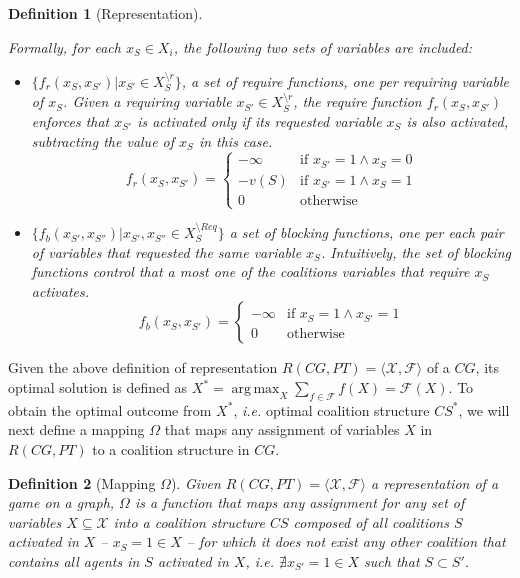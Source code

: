 \documentclass[11pt, twoside, titlepage, a4paper, openright]{report}
\newtheorem{Def}{Definition}
\begin{document}
\begin{Def}[Representation]
\begin{itemize}
\begin{itemize}
Formally, for each $x_S \in X_i$, the following two sets of variables are included:
\begin{itemize}
\renewcommand{\labelitemiii}{$\cdot$}
\item $\{f_r(x_S,x_{S'})|x_{S'}\in X^{\setminus r}_S\}$, a set of \textit{require functions}, one per requiring variable of $x_S$. Given a requiring variable $x_{S'}\in X^{\setminus r}_S$, the require function $f_r(x_S,x_{S'})$ enforces that $x_{S'}$ is activated only if its requested variable $x_S$ is also activated, subtracting the value of $x_S$ in this case.
\begin{equation}\label{eq:reqfun}
f_r(x_S,x_{S'})=\begin{cases}-\infty & \mbox{if } x_{S'}=1 \wedge x_{S}=0\\-v(S) & \mbox{if } x_{S'}=1 \wedge x_{S}=1\\0 & \mbox{otherwise}\end{cases}
\end{equation}
\item $\{f_b(x_{S'},x_{S''})|x_{S'},x_{S''}\in X^{\setminus Req}_S\}$ a set of \textit{blocking functions}, one per each pair of variables that requested the same variable $x_S$. Intuitively, the set of blocking functions control that a most one of the coalitions variables that require $x_S$ activates.
\begin{equation}\label{eq:blockfun}
f_b(x_S,x_{S'})=\begin{cases}-\infty & \mbox{if } x_{S}=1 \wedge x_{S'}=1\\0 & \mbox{otherwise}\end{cases}
\end{equation}
\end{itemize}
\end{itemize}
\end{itemize}
\end{Def}

\noindent Given the above definition of representation $R(CG,PT)=\langle\mathcal{X},\mathcal{F}\rangle$ of a $CG$, its optimal solution is defined as $X^*=\operatorname{arg\,max}_{X}\sum_{f\in\mathcal{F}}f(X)=\mathcal{F}(X)$. To obtain the optimal outcome from $X^*$, \textit{i.e.} optimal coalition structure $CS^*$, we will next define a mapping $\Omega$ that maps any assignment of variables $X$ in $R(CG,PT)$ to
a coalition structure in $CG$.

\begin{Def}[Mapping $\Omega$]
Given $R(CG, PT) = \langle\mathcal{X},\mathcal{F}\rangle$ a representation of a game on a graph, $\Omega$ is a function that maps any assignment for any set of variables $X \subseteq \mathcal{X}$ into a coalition structure $CS$ composed of all coalitions $S$ activated in $X$ -- $x_S = 1 \in X$ -- for which it does not exist any other coalition that contains all agents in $S$ activated in $X$, \textit{i.e.} $ \nexists x_{S'}=1 \in X$ such that $S \subset S'$.
\end{Def}
\end{document}
